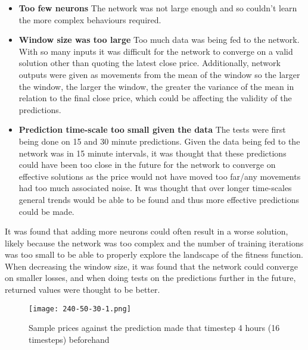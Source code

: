             \begin{itemize}
                \item \textbf{Too few neurons} The network was not large enough and so couldn't learn the more complex behaviours required.
                
                \item \textbf{Window size was too large} Too much data was being fed to the network. With so many inputs it was difficult for the network to converge on a valid solution other than quoting the latest close price. Additionally, network outputs were given as movements from the mean of the window so the larger the window, the larger the window, the greater the variance of the mean in relation to the final close price, which could be affecting the validity of the predictions. 
                
                \item \textbf{Prediction time-scale too small given the data} The tests were first being done on 15 and 30 minute predictions. Given the data being fed to the network was in 15 minute intervals, it was thought that these predictions could have been too close in the future for the network to converge on effective solutions as the price would not have moved too far/any movements had too much associated noise. It was thought that over longer time-scales general trends would be able to be found and thus more effective predictions could be made.
            
            \end{itemize}
            

            It was found that adding more neurons could often result in a worse solution, likely because the network was too complex and the number of training iterations was too small to be able to properly explore the landscape of the fitness function. When decreasing the window size, it was found that the network could converge on smaller losses, and when doing tests on the predictions further in the future, returned values were thought to be better.

            \begin{figure}[h]
                \centering
                \texttt{[image: 240-50-30-1.png]}
                \caption{Sample prices against the prediction made that timestep 4 hours (16 timesteps) beforehand}
                \label{fig:240_predictions}
            \end{figure}

